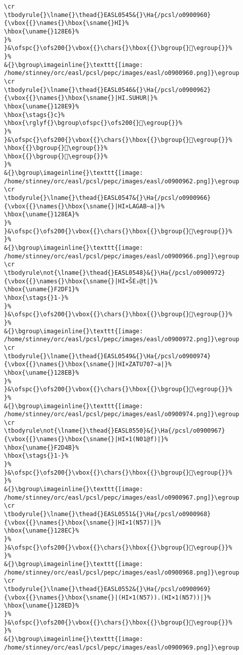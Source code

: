 \begin{verbatim}
\cr
\tbodyrule{}\lname{}\thead{}EASL0545&{}\Ha{/pcsl/o0900960}{\vbox{{}\names{}\hbox{\sname{}HI}%
\hbox{\uname{}128E6}%
}%
}&\ofspc{}\ofs200{}\vbox{{}\chars{}\hbox{{}\bgroup{}𒣦\egroup{}}%
}%
&{}\bgroup\imageinline{}\texttt{[image: /home/stinney/orc/easl/pcsl/pepc/images/easl/o0900960.png]}\egroup
\cr
\tbodyrule{}\lname{}\thead{}EASL0546&{}\Ha{/pcsl/o0900962}{\vbox{{}\names{}\hbox{\sname{}|HI.SUHUR|}%
\hbox{\uname{}128E9}%
\hbox{\stags{}c}%
\hbox{\rglyf{}\bgroup\ofspc{}\ofs200{}𒣩\egroup{}}%
}%
}&\ofspc{}\ofs200{}\vbox{{}\chars{}\hbox{{}\bgroup{}𒣧\egroup{}}%
\hbox{{}\bgroup{}𒣨\egroup{}}%
\hbox{{}\bgroup{}𒣩\egroup{}}%
}%
&{}\bgroup\imageinline{}\texttt{[image: /home/stinney/orc/easl/pcsl/pepc/images/easl/o0900962.png]}\egroup
\cr
\tbodyrule{}\lname{}\thead{}EASL0547&{}\Ha{/pcsl/o0900966}{\vbox{{}\names{}\hbox{\sname{}|HI×LAGAB∼a|}%
\hbox{\uname{}128EA}%
}%
}&\ofspc{}\ofs200{}\vbox{{}\chars{}\hbox{{}\bgroup{}𒣪\egroup{}}%
}%
&{}\bgroup\imageinline{}\texttt{[image: /home/stinney/orc/easl/pcsl/pepc/images/easl/o0900966.png]}\egroup
\cr
\tbodyrule\not{\lname{}\thead{}EASL0548}&{}\Ha{/pcsl/o0900972}{\vbox{{}\names{}\hbox{\sname{}|HI×ŠE₃@t|}%
\hbox{\uname{}F2DF1}%
\hbox{\stags{}1-}%
}%
}&\ofspc{}\ofs200{}\vbox{{}\chars{}\hbox{{}\bgroup{}󲷱\egroup{}}%
}%
&{}\bgroup\imageinline{}\texttt{[image: /home/stinney/orc/easl/pcsl/pepc/images/easl/o0900972.png]}\egroup
\cr
\tbodyrule{}\lname{}\thead{}EASL0549&{}\Ha{/pcsl/o0900974}{\vbox{{}\names{}\hbox{\sname{}|HI×ZATU707∼a|}%
\hbox{\uname{}128EB}%
}%
}&\ofspc{}\ofs200{}\vbox{{}\chars{}\hbox{{}\bgroup{}𒣫\egroup{}}%
}%
&{}\bgroup\imageinline{}\texttt{[image: /home/stinney/orc/easl/pcsl/pepc/images/easl/o0900974.png]}\egroup
\cr
\tbodyrule\not{\lname{}\thead{}EASL0550}&{}\Ha{/pcsl/o0900967}{\vbox{{}\names{}\hbox{\sname{}|HI×1(N01@f)|}%
\hbox{\uname{}F2D4B}%
\hbox{\stags{}1-}%
}%
}&\ofspc{}\ofs200{}\vbox{{}\chars{}\hbox{{}\bgroup{}󲵋\egroup{}}%
}%
&{}\bgroup\imageinline{}\texttt{[image: /home/stinney/orc/easl/pcsl/pepc/images/easl/o0900967.png]}\egroup
\cr
\tbodyrule{}\lname{}\thead{}EASL0551&{}\Ha{/pcsl/o0900968}{\vbox{{}\names{}\hbox{\sname{}|HI×1(N57)|}%
\hbox{\uname{}128EC}%
}%
}&\ofspc{}\ofs200{}\vbox{{}\chars{}\hbox{{}\bgroup{}𒣬\egroup{}}%
}%
&{}\bgroup\imageinline{}\texttt{[image: /home/stinney/orc/easl/pcsl/pepc/images/easl/o0900968.png]}\egroup
\cr
\tbodyrule{}\lname{}\thead{}EASL0552&{}\Ha{/pcsl/o0900969}{\vbox{{}\names{}\hbox{\sname{}|(HI×1(N57)).(HI×1(N57))|}%
\hbox{\uname{}128ED}%
}%
}&\ofspc{}\ofs200{}\vbox{{}\chars{}\hbox{{}\bgroup{}𒣭\egroup{}}%
}%
&{}\bgroup\imageinline{}\texttt{[image: /home/stinney/orc/easl/pcsl/pepc/images/easl/o0900969.png]}\egroup

\end{verbatim}
